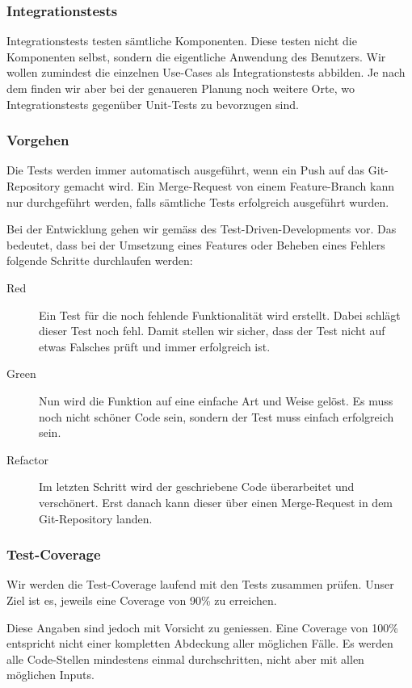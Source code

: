\documentclass[a4paper]{article}
\begin{document}
\subsubsection{Integrationstests}

Integrationstests testen sämtliche Komponenten. Diese testen nicht die Komponenten selbst, sondern die eigentliche Anwendung des Benutzers.
Wir wollen zumindest die einzelnen Use-Cases als Integrationstests abbilden. Je nach dem finden wir aber bei der genaueren Planung noch weitere Orte, wo Integrationstests gegenüber Unit-Tests zu bevorzugen sind.

\subsubsection{Vorgehen}

Die Tests werden immer automatisch ausgeführt, wenn ein Push auf das Git-Repository gemacht wird.
Ein Merge-Request von einem Feature-Branch kann nur durchgeführt werden, falls sämtliche Tests erfolgreich ausgeführt wurden.

Bei der Entwicklung gehen wir gemäss des Test-Driven-Developments vor.
Das bedeutet, dass bei der Umsetzung eines Features oder Beheben eines Fehlers folgende Schritte durchlaufen werden:

\begin{description}
  \item[Red]
    Ein Test für die noch fehlende Funktionalität wird erstellt.
    Dabei schlägt dieser Test noch fehl.
    Damit stellen wir sicher, dass der Test nicht auf etwas Falsches prüft und immer erfolgreich ist.
  \item[Green]
    Nun wird die Funktion auf eine einfache Art und Weise gelöst.
    Es muss noch nicht schöner Code sein, sondern der Test muss einfach erfolgreich sein.
  \item[Refactor]
    Im letzten Schritt wird der geschriebene Code überarbeitet und verschönert.
    Erst danach kann dieser über einen Merge-Request in dem Git-Repository landen.
\end{description}

\subsubsection{Test-Coverage}

Wir werden die Test-Coverage laufend mit den Tests zusammen prüfen.
Unser Ziel ist es, jeweils eine Coverage von 90\% zu erreichen.

Diese Angaben sind jedoch mit Vorsicht zu geniessen.
Eine Coverage von 100\% entspricht nicht einer kompletten Abdeckung aller möglichen Fälle.
Es werden alle Code-Stellen mindestens einmal durchschritten, nicht aber mit allen möglichen Inputs.
\end{document}
